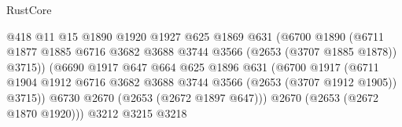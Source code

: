 \begin{lexlean}{RustCore}
\begin{coremodule}
                                            @418
                                            @11
                                            @15
                                            @1890
                                            @1920
                                            @1927
                                            @625
                                            @1869
                                            @631
                                            (@6700
                                              @1890
                                              (@6711
                                                @1877
                                                @1885
                                                @6716
                                                @3682
                                                @3688
                                                @3744
                                                @3566
                                                (@2653 (@3707 @1885 @1878))
                                                @3715))
                                            (@6690
                                              @1917
                                              @647
                                              @664
                                              @625
                                              @1896
                                              @631
                                              (@6700
                                                @1917
                                                (@6711
                                                  @1904
                                                  @1912
                                                  @6716
                                                  @3682
                                                  @3688
                                                  @3744
                                                  @3566
                                                  (@2653 (@3707 @1912 @1905))
                                                  @3715))
                                              @6730
                                              @2670
                                              (@2653 (@2672 @1897 @647)))
                                            @2670
                                            (@2653 (@2672 @1870 @1920)))
                                          @3212
                                          @3215
                                          @3218

\end{coremodule}
\end{lexlean}
